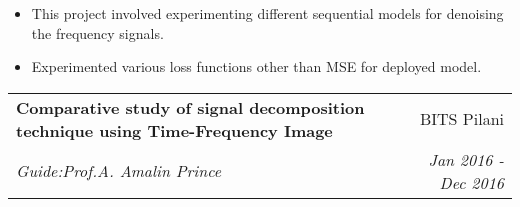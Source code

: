 \documentclass[letterpaper,10.5pt]{article}
\makeatletter
\newcommand{\resumeSubheading}[4]{
  \vspace{-1pt}\item
    \begin{tabular*}{0.97\textwidth}{l@{\extracolsep{\fill}}r}
      \textbf{#1} & #2 \\
      \textit{\small#3} & \textit{\small #4} \\
    \end{tabular*}\vspace{-4pt}
}
\makeatother
\begin{document}
		\vspace*{-1.5mm}
		\begin{itemize}
		\item This project involved experimenting different sequential models for denoising the frequency signals.\vspace*{-1.5mm}
		\item Experimented various loss functions other than MSE for deployed model.\vspace*{-1.5mm}
		\end{itemize}    
 \begin{comment}   
      
		
	
      
\resumeSubheading
      {EEG-based Classification of Bilingual Unspoken Speech using ANN}{BITS Pilani}
      {Guide:Prof.Veeky Baths}{Dec 2016 - Feb 2017}
     
\vspace*{-1.5mm}
		\begin{itemize}
		\item This work was done to understand the ability of EEG signal to interpret unspoken or imagined speech.\href{https://github.com/nappaillav/Heart_Rate_monitoring_Device}{\textcolor{blue}{[code]}}\vspace*{-1.5mm}
		\item The best accuracy of 85.20\% \& 92.18\% for decision and language classification respectively and the overall accuracy of bilingual speech classification was 75.38\%.
		\vspace*{-1.5mm}
		\end{itemize}
\end{comment}
     \resumeSubheading
      {Comparative study of signal decomposition technique using Time-Frequency Image}{BITS Pilani}
      {Guide:Prof.A. Amalin Prince}{Jan 2016 - Dec 2016}
     \vspace*{-1.5mm}
\end{document}

